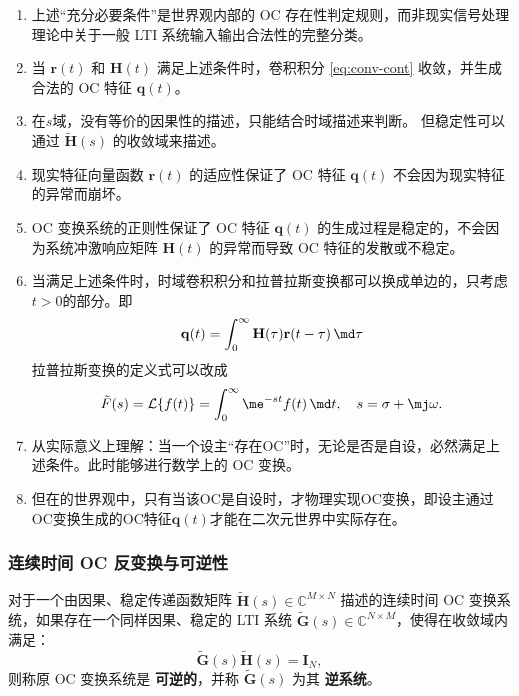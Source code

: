 \begin{remark}
    \begin{enumerate}
        \item 上述“充分必要条件”是\wkn{}世界观内部的 OC 存在性判定规则，而非现实信号处理理论中关于一般 LTI 系统输入输出合法性的完整分类。
        \item 当 $\mathbf{r}(t)$ 和 $\mathbf{H}(t)$ 满足上述条件时，卷积积分 \eqref{eq:conv-cont} 收敛，并生成合法的 OC 特征 $\mathbf{q}(t)$。
        \item 在\(s\)域，没有等价的因果性的描述，只能结合时域描述来判断。
              但稳定性可以通过 $\tilde{\mathbf{H}}(s)$ 的收敛域来描述。
        \item 现实特征向量函数 $\mathbf{r}(t)$ 的适应性保证了 OC 特征 $\mathbf{q}(t)$ 不会因为现实特征的异常而崩坏。
        \item OC 变换系统的正则性保证了 OC 特征 $\mathbf{q}(t)$ 的生成过程是稳定的，不会因为系统冲激响应矩阵 $\mathbf{H}(t)$ 的异常而导致 OC 特征的发散或不稳定。
        \item 当满足上述条件时，时域卷积积分和拉普拉斯变换都可以换成单边的，只考虑\(t>0\)的部分。即
              \begin{equation}
                  \mathbf{q}(t) = \int_0^\infty \mathbf{H}(\tau) \mathbf{r}(t-\tau) \, \md\tau
              \end{equation}
              拉普拉斯变换的定义式可以改成
              \begin{equation}
                  \tilde{F}(s)=\mathcal{L}\{f(t)\}=\int_0^\infty\me^{-st}f(t)\,\md t,\quad s=\sigma+\mj\omega.
              \end{equation}
        \item 从实际意义上理解：当一个设主“存在OC”时，无论是否是自设，必然满足上述条件。此时能够进行数学上的 OC 变换。
        \item 但在\wkn{}的世界观中，只有当该OC是自设时，才物理实现OC变换，即设主通过OC变换生成的OC特征$\mathbf{q}(t)$才能在二次元世界中实际存在。
    \end{enumerate}
\end{remark}

\subsubsection{连续时间 OC 反变换与可逆性}

\begin{definition}
    对于一个由因果、稳定传递函数矩阵 $\tilde{\mathbf{H}}(s) \in \mathbb{C}^{M \times N}$ 描述的连续时间 OC 变换系统，如果存在一个同样因果、稳定的 LTI 系统 $\tilde{\mathbf{G}}(s) \in \mathbb{C}^{N \times M}$，使得在收敛域内满足：
    \begin{equation}
        \tilde{\mathbf{G}}(s) \tilde{\mathbf{H}}(s) = \mathbf{I}_N,
    \end{equation}
    则称原 OC 变换系统是 \textbf{可逆的}，并称 $\tilde{\mathbf{G}}(s)$ 为其 \textbf{逆系统}。
\end{definition}

